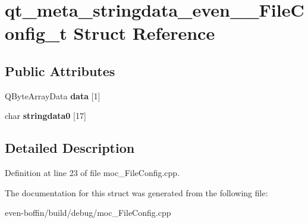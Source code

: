 \hypertarget{structqt__meta__stringdata__even_____file_config__t}{}\section{qt\+\_\+meta\+\_\+stringdata\+\_\+even\+\_\+\+\_\+\+File\+Config\+\_\+t Struct Reference}
\label{structqt__meta__stringdata__even_____file_config__t}
\subsection*{Public Attributes}
\begin{DoxyCompactItemize}
\item 
\mbox{\label{structqt__meta__stringdata__even_____file_config__t_ae1575efde235cf1a7825f9a0f70c81d8}} 
Q\+Byte\+Array\+Data {\bfseries data} \mbox{[}1\mbox{]}
\item 
\mbox{\label{structqt__meta__stringdata__even_____file_config__t_a20c53e407e4ea32f17d6a9800f6d2eac}} 
char {\bfseries stringdata0} \mbox{[}17\mbox{]}
\end{DoxyCompactItemize}


\subsection{Detailed Description}


Definition at line 23 of file moc\+\_\+\+File\+Config.\+cpp.



The documentation for this struct was generated from the following file\+:\begin{DoxyCompactItemize}
\item 
even-\/boffin/build/debug/moc\+\_\+\+File\+Config.\+cpp\end{DoxyCompactItemize}
